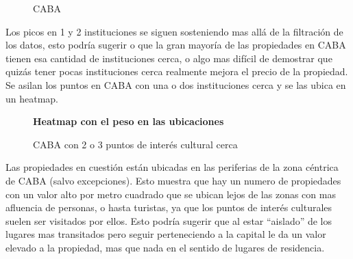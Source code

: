\documentclass[a4paper, 10pt]{article}
\newcommand\tab[1][0.5cm]{\hspace*{#1}}
\begin{document}
				\begin{figure}
    				\centering
    				\caption{CABA}
				\end{figure}
				\FloatBarrier
				
				Los picos en 1 y 2 instituciones se siguen sosteniendo mas allá de la filtración de 
				los datos, esto podría sugerir o que la gran mayoría de las propiedades en CABA 
				tienen esa cantidad de instituciones cerca, o algo mas difícil de demostrar que 
				quizás tener pocas instituciones cerca realmente mejora el precio de la propiedad.\\
				\tab Se asilan los puntos en CABA con una o dos instituciones cerca y se las ubica en un heatmap.
				
				\begin{figure}
    				\centering
    				\textbf{Heatmap con el peso en las ubicaciones}\par\medskip
    				\caption{CABA  con 2 o 3 puntos de interés cultural cerca}
				\end{figure}				
				\FloatBarrier
				
				Las propiedades en cuestión están ubicadas en las periferias de la zona céntrica de CABA  
				(salvo excepciones). Esto muestra que hay un numero de propiedades con un valor alto 
				por metro cuadrado que se ubican lejos de las zonas con mas afluencia de personas, 
				o hasta turistas, ya que los puntos de interés culturales suelen ser visitados por 
				ellos. Esto podría sugerir que al estar “aislado” de los lugares mas transitados 
				pero seguir perteneciendo a la capital le da un valor elevado a la propiedad, 
				mas que nada en el sentido de lugares de residencia.\\
				
\end{document}
